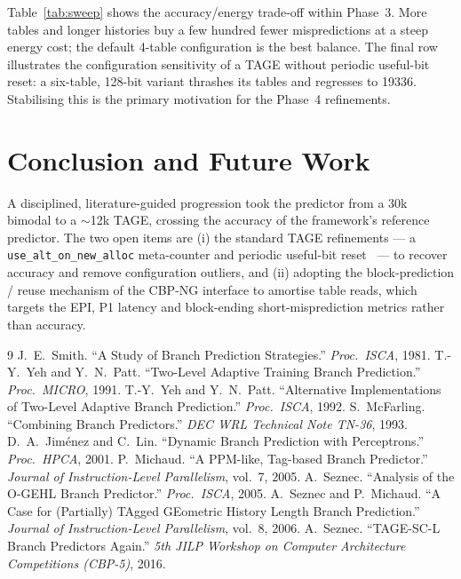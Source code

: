 \documentclass[11pt]{article}
\newcommand{\code}[1]{\texttt{\small #1}}
\begin{document}
Table~\ref{tab:sweep} shows the accuracy/energy trade-off within Phase~3. More
tables and longer histories buy a few hundred fewer mispredictions at a steep
energy cost; the default 4-table configuration is the best balance. The final
row illustrates the configuration sensitivity of a TAGE without periodic
useful-bit reset: a six-table, 128-bit variant thrashes its tables and
regresses to \num{19336}. Stabilising this is the primary motivation for the
Phase~4 refinements.

\section{Conclusion and Future Work}
A disciplined, literature-guided progression took the predictor from a 30k
bimodal to a $\sim$12k TAGE, crossing the accuracy of the framework's reference
predictor. The two open items are (i) the standard TAGE refinements --- a
\code{use\_alt\_on\_new\_alloc} meta-counter and periodic useful-bit
reset~\cite{seznec2006,seznec2016} --- to recover accuracy and remove
configuration outliers, and (ii) adopting the block-prediction / reuse mechanism
of the CBP-NG interface to amortise table reads, which targets the EPI, P1
latency and block-ending short-misprediction metrics rather than accuracy.

\begin{thebibliography}{9}
\small
{} J.~E.~Smith. ``A Study of Branch Prediction Strategies.''
\emph{Proc.\ ISCA}, 1981.
 T.-Y.~Yeh and Y.~N.~Patt. ``Two-Level Adaptive Training
Branch Prediction.'' \emph{Proc.\ MICRO}, 1991.
 T.-Y.~Yeh and Y.~N.~Patt. ``Alternative Implementations of
Two-Level Adaptive Branch Prediction.'' \emph{Proc.\ ISCA}, 1992.
 S.~McFarling. ``Combining Branch Predictors.''
\emph{DEC WRL Technical Note TN-36}, 1993.
 D.~A.~Jim\'enez and C.~Lin. ``Dynamic Branch Prediction
with Perceptrons.'' \emph{Proc.\ HPCA}, 2001.
 P.~Michaud. ``A PPM-like, Tag-based Branch Predictor.''
\emph{Journal of Instruction-Level Parallelism}, vol.~7, 2005.
 A.~Seznec. ``Analysis of the O-GEHL Branch Predictor.''
\emph{Proc.\ ISCA}, 2005.
 A.~Seznec and P.~Michaud. ``A Case for (Partially) TAgged
GEometric History Length Branch Prediction.'' \emph{Journal of Instruction-Level
Parallelism}, vol.~8, 2006.
 A.~Seznec. ``TAGE-SC-L Branch Predictors Again.''
\emph{5th JILP Workshop on Computer Architecture Competitions (CBP-5)}, 2016.
\end{thebibliography}
\end{document}
